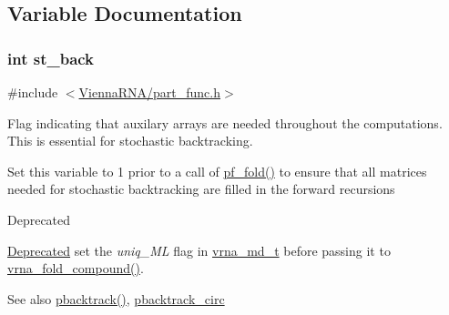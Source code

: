 \subsection{Variable Documentation}
\hypertarget{group__subopt__stochbt_gacd79b1a570e6ad9be24cb11fe8cae30a}{}
\subsubsection[{st\+\_\+back}]{\setlength{\rightskip}{0pt plus 5cm}int st\+\_\+back}\label{group__subopt__stochbt_gacd79b1a570e6ad9be24cb11fe8cae30a}


{\ttfamily \#include $<$\hyperlink{part__func_8h}{Vienna\+R\+N\+A/part\+\_\+func.\+h}$>$}



Flag indicating that auxilary arrays are needed throughout the computations. This is essential for stochastic backtracking. 

Set this variable to 1 prior to a call of \hyperlink{group__pf__fold_gadc3db3d98742427e7001a7fd36ef28c2}{pf\+\_\+fold()} to ensure that all matrices needed for stochastic backtracking are filled in the forward recursions

\begin{DoxyRefDesc}{Deprecated}
\item[\hyperlink{deprecated__deprecated000100}{Deprecated}]set the {\itshape uniq\+\_\+\+M\+L} flag in \hyperlink{group__model__details_ga1f8a10e12a0a1915f2a4eff0b28ea17c}{vrna\+\_\+md\+\_\+t} before passing it to \hyperlink{group__fold__compound_ga6601d994ba32b11511b36f68b08403be}{vrna\+\_\+fold\+\_\+compound()}.\end{DoxyRefDesc}


\begin{DoxySeeAlso}{See also}
\hyperlink{group__subopt__stochbt_gac03ca6db186bb3bf0a2a326d7fb3ba03}{pbacktrack()}, \hyperlink{group__subopt__stochbt_ga00474051204ac9ad576b3e45174d03ff}{pbacktrack\+\_\+circ} 
\end{DoxySeeAlso}
